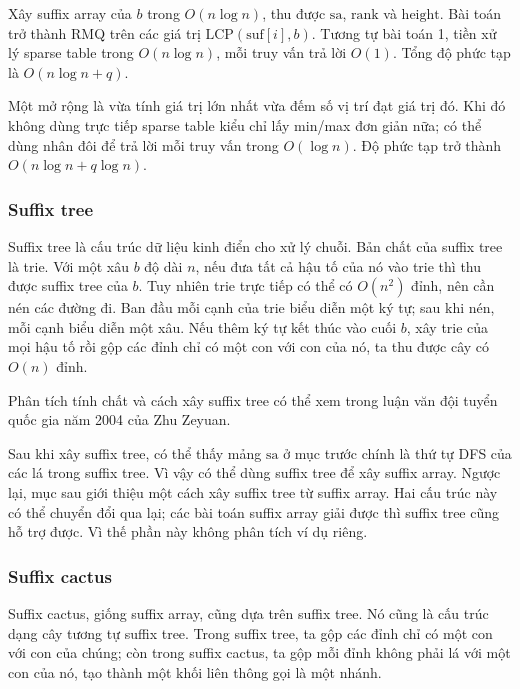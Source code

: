 \documentclass[11pt]{article}
\begin{document}
Xây suffix array của \(b\) trong \(O(n\log n)\), thu được \(\mathrm{sa}\),
\(\mathrm{rank}\) và \(\mathrm{height}\). Bài toán trở thành RMQ trên các giá
trị \(\mathrm{LCP}(\mathrm{suf}[i],b)\). Tương tự bài toán 1, tiền xử lý sparse
table trong \(O(n\log n)\), mỗi truy vấn trả lời \(O(1)\). Tổng độ phức tạp là
\(O(n\log n+q)\).

Một mở rộng là vừa tính giá trị lớn nhất vừa đếm số vị trí đạt giá trị đó. Khi
đó không dùng trực tiếp sparse table kiểu chỉ lấy min/max đơn giản nữa; có thể
dùng nhân đôi để trả lời mỗi truy vấn trong \(O(\log n)\). Độ phức tạp trở thành
\(O(n\log n+q\log n)\).

\subsubsection{Suffix tree}

Suffix tree là cấu trúc dữ liệu kinh điển cho xử lý chuỗi. Bản chất của suffix
tree là trie. Với một xâu \(b\) độ dài \(n\), nếu đưa tất cả hậu tố của nó vào
trie thì thu được suffix tree của \(b\). Tuy nhiên trie trực tiếp có thể có
\(O(n^2)\) đỉnh, nên cần nén các đường đi. Ban đầu mỗi cạnh của trie biểu diễn
một ký tự; sau khi nén, mỗi cạnh biểu diễn một xâu. Nếu thêm ký tự kết thúc vào
cuối \(b\), xây trie của mọi hậu tố rồi gộp các đỉnh chỉ có một con với con của
nó, ta thu được cây có \(O(n)\) đỉnh.

Phân tích tính chất và cách xây suffix tree có thể xem trong luận văn đội tuyển
quốc gia năm 2004 của Zhu Zeyuan.

Sau khi xây suffix tree, có thể thấy mảng \(\mathrm{sa}\) ở mục trước chính là
thứ tự DFS của các lá trong suffix tree. Vì vậy có thể dùng suffix tree để xây
suffix array. Ngược lại, mục sau giới thiệu một cách xây suffix tree từ suffix
array. Hai cấu trúc này có thể chuyển đổi qua lại; các bài toán suffix array
giải được thì suffix tree cũng hỗ trợ được. Vì thế phần này không phân tích ví
dụ riêng.

\subsubsection{Suffix cactus}

Suffix cactus, giống suffix array, cũng dựa trên suffix tree. Nó cũng là cấu
trúc dạng cây tương tự suffix tree. Trong suffix tree, ta gộp các đỉnh chỉ có
một con với con của chúng; còn trong suffix cactus, ta gộp mỗi đỉnh không phải
lá với một con của nó, tạo thành một khối liên thông gọi là một nhánh.
\end{document}
